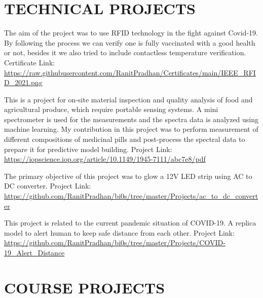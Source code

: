 \documentclass[11pt,a4paper,sans]{moderncv}        %
\begin{document}
\section{TECHNICAL PROJECTS}

{The aim of the project was to use RFID technology in the fight against Covid-19. By following the process we can verify one is fully vaccinated with a good health or not, besides it we also tried to include contactless temperature verification.{\newline}
Certificate Link: {\newline}
\url{https://raw.githubusercontent.com/RanitPradhan/Certificates/main/IEEE_RFID_2021.png}}{}

{This is a project for on-site material inspection and quality analysis of food and agricultural produce, which require portable sensing systems. A mini spectrometer is used for the measurements and the spectra data is analyzed using machine learning. My contribution in this project was to perform measurement of different compositions of medicinal pills and post-process the spectral data to prepare it for predictive model building.{\newline}
Project Link: {\newline}
\url{https://iopscience.iop.org/article/10.1149/1945-7111/abc7e8/pdf}}{}

{The primary objective of this project was to glow a 12V LED strip using AC to DC converter.{\newline} 
Project Link: {\newline}
\url{https://github.com/RanitPradhan/bi0s/tree/master/Projects/ac_to_dc_converter}}{}

{This project is related to the current pandemic situation of COVID-19. A replica model to alert human to keep safe distance from each other. {\newline} 
Project Link: {\newline}
\url{https://github.com/RanitPradhan/bi0s/tree/master/Projects/COVID-19_Alert_Distance}}{}

\section{COURSE PROJECTS}
\end{document}
